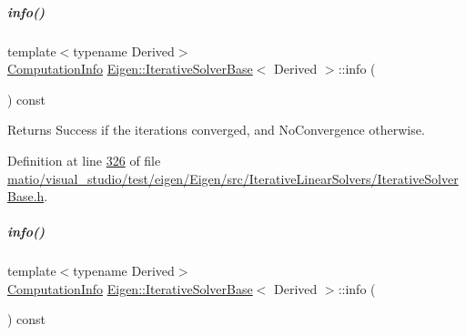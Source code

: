\mbox{\label{group___iterative_linear_solvers___module_a0d6b459433a316b4f12d48e5c80d61fe}} 
\subparagraph{\texorpdfstring{info()}{info()}\hspace{0.1cm}{\footnotesize\ttfamily [1/2]}}
{\footnotesize\ttfamily template$<$typename Derived$>$ \\
\hyperlink{group__enums_ga85fad7b87587764e5cf6b513a9e0ee5e}{Computation\+Info} \hyperlink{group___iterative_linear_solvers___module_class_eigen_1_1_iterative_solver_base}{Eigen\+::\+Iterative\+Solver\+Base}$<$ Derived $>$\+::info (\begin{DoxyParamCaption}{ }\end{DoxyParamCaption}) const\hspace{0.3cm}{\ttfamily [inline]}}

\begin{DoxyReturn}{Returns}
Success if the iterations converged, and No\+Convergence otherwise. 
\end{DoxyReturn}


Definition at line \hyperlink{matio_2visual__studio_2test_2eigen_2_eigen_2src_2_iterative_linear_solvers_2_iterative_solver_base_8h_source_l00326}{326} of file \hyperlink{matio_2visual__studio_2test_2eigen_2_eigen_2src_2_iterative_linear_solvers_2_iterative_solver_base_8h_source}{matio/visual\+\_\+studio/test/eigen/\+Eigen/src/\+Iterative\+Linear\+Solvers/\+Iterative\+Solver\+Base.\+h}.

\mbox{\label{group___iterative_linear_solvers___module_a0d6b459433a316b4f12d48e5c80d61fe}} 
\subparagraph{\texorpdfstring{info()}{info()}\hspace{0.1cm}{\footnotesize\ttfamily [2/2]}}
{\footnotesize\ttfamily template$<$typename Derived$>$ \\
\hyperlink{group__enums_ga85fad7b87587764e5cf6b513a9e0ee5e}{Computation\+Info} \hyperlink{group___iterative_linear_solvers___module_class_eigen_1_1_iterative_solver_base}{Eigen\+::\+Iterative\+Solver\+Base}$<$ Derived $>$\+::info (\begin{DoxyParamCaption}{ }\end{DoxyParamCaption}) const\hspace{0.3cm}{\ttfamily [inline]}}

